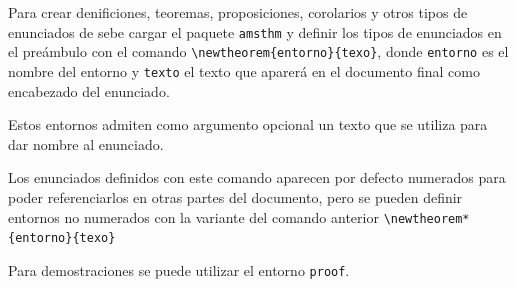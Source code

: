 \documentclass[
  a4paper,
]{scrreport}
\theoremstyle{definition}
\theoremstyle{remark}
\begin{document}
Para crear denificiones, teoremas, proposiciones, corolarios y otros
tipos de enunciados de sebe cargar el paquete \texttt{amsthm} y definir
los tipos de enunciados en el preámbulo con el comando
\texttt{\textbackslash{}newtheorem\{entorno\}\{texo\}}, donde
\texttt{entorno} es el nombre del entorno y \texttt{texto} el texto que
aparerá en el documento final como encabezado del enunciado.

Estos entornos admiten como argumento opcional un texto que se utiliza
para dar nombre al enunciado.

Los enunciados definidos con este comando aparecen por defecto numerados
para poder referenciarlos en otras partes del documento, pero se pueden
definir entornos no numerados con la variante del comando anterior
\texttt{\textbackslash{}newtheorem*\{entorno\}\{texo\}}

Para demostraciones se puede utilizar el entorno \texttt{proof}.
\end{document}
